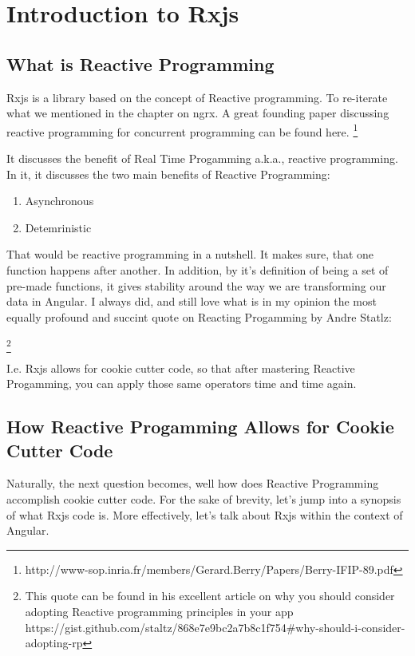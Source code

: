 \chapter{ Introduction to Rxjs }

\section{ What is Reactive Programming}

Rxjs is a library based on the concept of Reactive programming. To re-iterate 
what we mentioned in the chapter on ngrx. A great founding paper discussing 
reactive programming for concurrent programming can be found here. 
\footnote{http://www-sop.inria.fr/members/Gerard.Berry/Papers/Berry-IFIP-89.pdf}

It discusses the benefit of Real Time Progamming a.k.a., reactive programming.
In it, it discusses the two main benefits of Reactive Programming:
\begin{enumerate}
  \item Asynchronous
  \item Detemrinistic
\end{enumerate}

That would be reactive programming in a nutshell. It makes sure, that one 
function happens after another. In addition, by it's definition of being 
a set of pre-made functions, it gives stability around the way we are 
transforming our data in Angular. I always did, and still love what is in my 
opinion the most equally profound and succint quote on Reacting Progamming by 
Andre Statlz: 

\begin{quote}
\end{quote} 
\footnote{This quote can be found in his excellent article on why you should 
consider adopting Reactive programming principles in your app 
https://gist.github.com/staltz/868e7e9bc2a7b8c1f754\#why-should-i-consider-adopting-rp}

I.e. Rxjs allows for cookie cutter code, so that after mastering Reactive 
Progamming, you can apply those same operators time and time again.

\section{How Reactive Progamming Allows for Cookie Cutter Code}
Naturally, the next question becomes, well how does Reactive Programming accomplish cookie 
cutter code. For the sake of brevity, let's jump into a synopsis of what Rxjs 
code is. More effectively, let's talk about Rxjs within the context of Angular.

